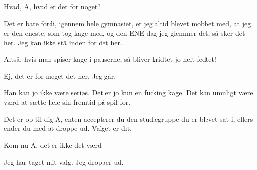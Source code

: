\documentclass[a4paper,11pt]{article}
\begin{document}
\begin{sketch}
 Hvad, A, hvad er det for noget?

 Det er bare fordi, igennem hele gymnasiet, er jeg altid blevet mobbet med, at jeg er den eneste, som tog kage med, og den ENE dag jeg glemmer det, så sker det her. Jeg kan ikke stå inden for det her.

 Altså, hvis man spiser kage i pauserne, så bliver kridtet jo helt fedtet!

 Ej, det er for meget det her. Jeg går.


 Han kan jo ikke være seriøs. Det er jo kun en fucking kage. Det kan umuligt være værd at sætte hele sin fremtid på spil for.


 Det er op til dig A, enten accepterer du den studiegruppe du er blevet sat i, ellers ender du med at droppe ud. Valget er dit.

 Kom nu A, det er ikke det værd

 Jeg har taget mit valg. Jeg dropper ud.

\end{sketch}
\end{document}

